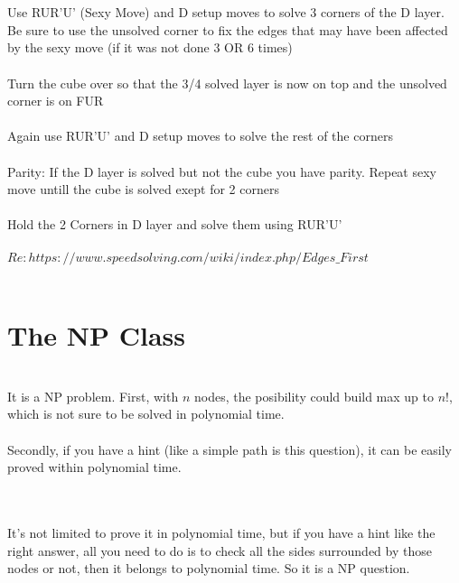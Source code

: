 \documentclass{article}
\begin{document}
\\\\Use RUR'U' (Sexy Move) and D setup moves to solve 3 corners of the D layer. Be sure to use the unsolved corner to fix the edges that may have been affected by the sexy move (if it was not done 3 OR 6 times)
\\\\Turn the cube over so that the 3/4 solved layer is now on top and the unsolved corner is on FUR
\\\\Again use RUR'U' and D setup moves to solve the rest of the corners
\\\\Parity: If the D layer is solved but not the cube you have parity. Repeat sexy move untill the cube is solved exept for 2 corners
\\\\Hold the 2 Corners in D layer and solve them using RUR'U'
\\\\$Re:https://www.speedsolving.com/wiki/index.php/Edges\_First$
\\\\
\section{The NP Class}
\\It is a NP problem. First, with $n$ nodes, the posibility could build max up to $n!$, which is not sure to be solved in polynomial time.
\\\\ Secondly, if you have a hint (like a simple path is this question), it can be easily proved within polynomial time.
\\\\
\\It's not limited to prove it in polynomial time, but if you have a hint like the right answer, all you need to do is to check all the sides surrounded by those nodes or not, then it belongs to polynomial time. So it is a NP question. 
\\
\end{document}

